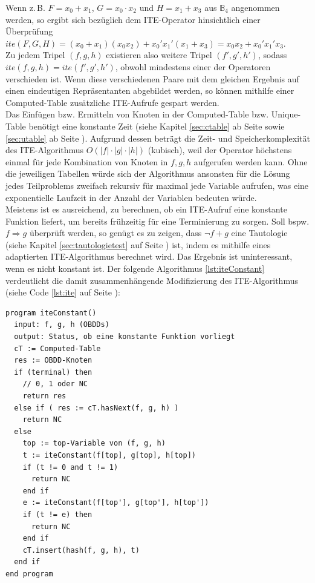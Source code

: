 Wenn z.\,B. $F = x_0+x_1$, $G = x_0 \cdot x_2$ und $H = x_1 + x_3$ aus $\mathbb{B}_4$ angenommen werden, so ergibt sich bezüglich dem ITE-Operator hinsichtlich einer Überprüfung $ite(F,G,H) = (x_0+x_1)(x_0x_2) + x_0'x_1'(x_1+x_3) = x_0x_2+x_0'x_1'x_3$.\\
Zu jedem Tripel $(f,g,h)$ existieren also weitere Tripel $(f',g',h')$, sodass $ite(f,g,h) = ite(f',g',h')$, obwohl mindestens einer der Operatoren verschieden ist. Wenn diese verschiedenen Paare mit dem gleichen Ergebnis auf einen eindeutigen Repräsentanten abgebildet werden, so können mithilfe einer Computed-Table zusätzliche ITE-Aufrufe gespart werden.\\
Das Einfügen bzw. Ermitteln von Knoten in der Computed-Table bzw. Unique-Table benötigt eine konstante Zeit (siehe Kapitel \ref{sec:ctable} ab Seite \pageref{sec:ctable} sowie \ref{sec:utable} ab Seite \pageref{sec:utable}). Aufgrund dessen beträgt die Zeit- und Speicherkomplexität des ITE-Algorithmus $O(|f| \cdot |g| \cdot |h|)$ (kubisch), weil der Operator höchstens einmal für jede Kombination von Knoten in $f, g, h$ aufgerufen werden kann. Ohne die jeweiligen Tabellen würde sich der Algorithmus ansonsten für die Lösung jedes Teilproblems zweifach rekursiv für maximal jede Variable aufrufen, was eine exponentielle Laufzeit in der Anzahl der Variablen bedeuten würde.\\
Meistens ist es ausreichend, zu berechnen, ob ein ITE-Aufruf eine konstante Funktion liefert, um bereits frühzeitig für eine Terminierung zu sorgen. Soll bspw. $f \Rightarrow g$ überprüft werden, so genügt es zu zeigen, dass $\neg f+g$ eine Tautologie (siehe Kapitel \ref{sec:tautologietest} auf Seite \pageref{sec:tautologietest}) ist, indem es mithilfe eines adaptierten ITE-Algorithmus berechnet wird. Das Ergebnis ist uninteressant, wenn es nicht konstant ist. Der folgende Algorithmus \ref{lst:iteConstant} verdeutlicht die damit zusammenhängende Modifizierung des ITE-Algorithmus (siehe Code \ref{lst:ite} auf Seite \pageref{lst:ite}):
\lstset{language=xml}
\begin{lstlisting}[frame=htrbl, caption={Implementierung von {\ttfamily iteConstant}}, label={lst:iteConstant}]
program iteConstant()
  input: f, g, h (OBDDs)
  output: Status, ob eine konstante Funktion vorliegt
  cT := Computed-Table
  res := OBDD-Knoten
  if (terminal) then
    // 0, 1 oder NC
    return res
  else if ( res := cT.hasNext(f, g, h) )
    return NC
  else
    top := top-Variable von (f, g, h)
    t := iteConstant(f[top], g[top], h[top])
    if (t != 0 and t != 1)
      return NC
    end if
    e := iteConstant(f[top'], g[top'], h[top'])
    if (t != e) then 
      return NC
    end if
    cT.insert(hash(f, g, h), t)
  end if
end program
\end{lstlisting}
